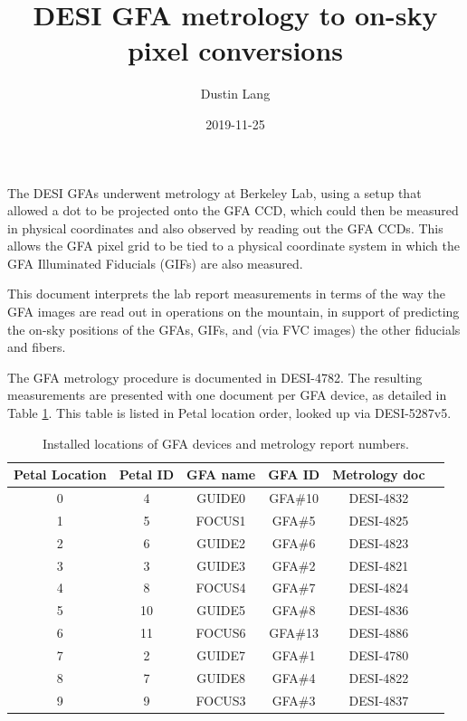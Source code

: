 \documentclass[10pt]{article}
\title{DESI GFA metrology to on-sky pixel conversions}
\author{Dustin Lang}
\date{2019-11-25}
\begin{document}
\maketitle

The DESI GFAs underwent metrology at Berkeley Lab, using a setup that
allowed a dot to be projected onto the GFA CCD, which could then be
measured in physical coordinates and also observed by reading out the
GFA CCDs.  This allows the GFA pixel grid to be tied to a physical
coordinate system in which the GFA Illuminated Fiducials (GIFs) are
also measured.

This document interprets the lab report measurements in terms of the
way the GFA images are read out in operations on the mountain, in
support of predicting the on-sky positions of the GFAs, GIFs, and (via
FVC images) the other fiducials and fibers.

The GFA metrology procedure is documented in DESI-4782.  The resulting
measurements are presented with one document per GFA device, as
detailed in Table \ref{tab:gfareports}.  This table is listed in Petal
location order, looked up via DESI-5287v5.

\begin{table}[h!]
  \begin{center}
    \begin{tabular}{|c|c|c|c|c|c|}
      \hline
      Petal Location & Petal ID & GFA name & GFA ID & Metrology doc \\
      \hline
      0 & 4 & GUIDE0 & GFA\#10 & DESI-4832 \\
      1 & 5 & FOCUS1 & GFA\#5 & DESI-4825 \\
      2 & 6 & GUIDE2 & GFA\#6 & DESI-4823 \\
      3 & 3 & GUIDE3 & GFA\#2 & DESI-4821 \\
      4 & 8 & FOCUS4 & GFA\#7 & DESI-4824 \\
      5 & 10 & GUIDE5 & GFA\#8 & DESI-4836 \\
      6 & 11 & FOCUS6 & GFA\#13 & DESI-4886 \\
      7 & 2 & GUIDE7 & GFA\#1 & DESI-4780 \\
      8 & 7 & GUIDE8 & GFA\#4 & DESI-4822 \\
      9 & 9 & FOCUS3 & GFA\#3 & DESI-4837 \\
      \hline
    \end{tabular}
    \caption{\label{tab:gfareports}Installed locations of GFA devices and
      metrology report numbers.}
  \end{center}
\end{table}
\end{document}
